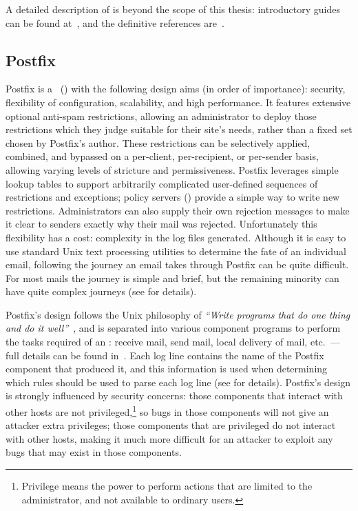 A detailed description of \SMTP{} is beyond the scope of this thesis:
introductory guides can be found at~\cite{smtp-intro-01,smtp-intro-02},
and the definitive references are~\cite{RFC821,RFC2821}.

\subsection{Postfix}

\label{postfix background}

Postfix is a \MTAlong{}~(\MTA{}) with the following design aims (in order
of importance): security, flexibility of configuration, scalability, and
high performance.  It features extensive optional anti-spam restrictions,
allowing an administrator to deploy those restrictions which they judge
suitable for their site's needs, rather than a fixed set chosen by
Postfix's author.  These restrictions can be selectively applied, combined,
and bypassed on a per-client, per-recipient, or per-sender basis, allowing
varying levels of stricture and permissiveness.  Postfix leverages simple
lookup tables to support arbitrarily complicated user-defined sequences of
restrictions and exceptions; policy servers ()
provide a simple way to write new restrictions.  Administrators can also
supply their own rejection messages to make it clear to senders exactly why
their mail was rejected.  Unfortunately this flexibility has a cost:
complexity in the log files generated.  Although it is easy to use standard
Unix text processing utilities to determine the fate of an individual
email, following the journey an email takes through Postfix can be quite
difficult.  For most mails the journey is simple and brief, but the
remaining minority can have quite complex journeys (see
 for details).

Postfix's design follows the Unix philosophy of \textit{``Write programs
that do one thing and do it well''\/}~\cite{unix-philosophy}, and is
separated into various component programs to perform the tasks required of
an \MTA{}\@: receive mail, send mail, local delivery of mail, etc.\ ---
full details can be found in~\cite{postfix-overview}.  Each log line
contains the name of the Postfix component that produced it, and this
information is used when determining which rules should be used to parse
each log line (see  for details).
Postfix's design is strongly influenced by security concerns: those
components that interact with other hosts are not
privileged,\footnote{Privilege means the power to perform actions that are
limited to the administrator, and not available to ordinary users.} so bugs
in those components will not give an attacker extra privileges; those
components that are privileged do not interact with other hosts, making it
much more difficult for an attacker to exploit any bugs that may exist in
those components.


